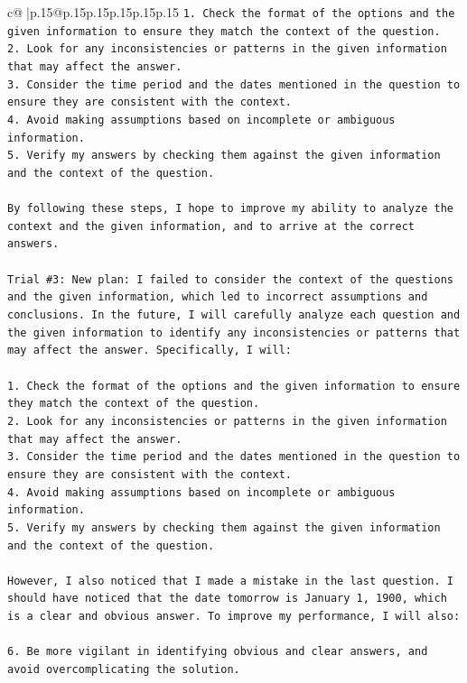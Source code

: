 \documentclass{article}
\begin{document}
{\begin{supertabular}{c@{$\;$}|p{.15\linewidth}@{}p{.15\linewidth}p{.15\linewidth}p{.15\linewidth}p{.15\linewidth}p{.15\linewidth}}
{{{\texttt{1. Check the format of the options and the given information to ensure they match the context of the question.} \\
\texttt{2. Look for any inconsistencies or patterns in the given information that may affect the answer.} \\
\texttt{3. Consider the time period and the dates mentioned in the question to ensure they are consistent with the context.} \\
\texttt{4. Avoid making assumptions based on incomplete or ambiguous information.} \\
\texttt{5. Verify my answers by checking them against the given information and the context of the question.} \\
\\ 
\texttt{By following these steps, I hope to improve my ability to analyze the context and the given information, and to arrive at the correct answers.} \\
\\ 
\texttt{Trial \#3: New plan: I failed to consider the context of the questions and the given information, which led to incorrect assumptions and conclusions. In the future, I will carefully analyze each question and the given information to identify any inconsistencies or patterns that may affect the answer. Specifically, I will:} \\
\\ 
\texttt{1. Check the format of the options and the given information to ensure they match the context of the question.} \\
\texttt{2. Look for any inconsistencies or patterns in the given information that may affect the answer.} \\
\texttt{3. Consider the time period and the dates mentioned in the question to ensure they are consistent with the context.} \\
\texttt{4. Avoid making assumptions based on incomplete or ambiguous information.} \\
\texttt{5. Verify my answers by checking them against the given information and the context of the question.} \\
\\ 
\texttt{However, I also noticed that I made a mistake in the last question. I should have noticed that the date tomorrow is January 1, 1900, which is a clear and obvious answer. To improve my performance, I will also:} \\
\\ 
\texttt{6. Be more vigilant in identifying obvious and clear answers, and avoid overcomplicating the solution.} \\
}}}
\end{supertabular}}
\end{document}
